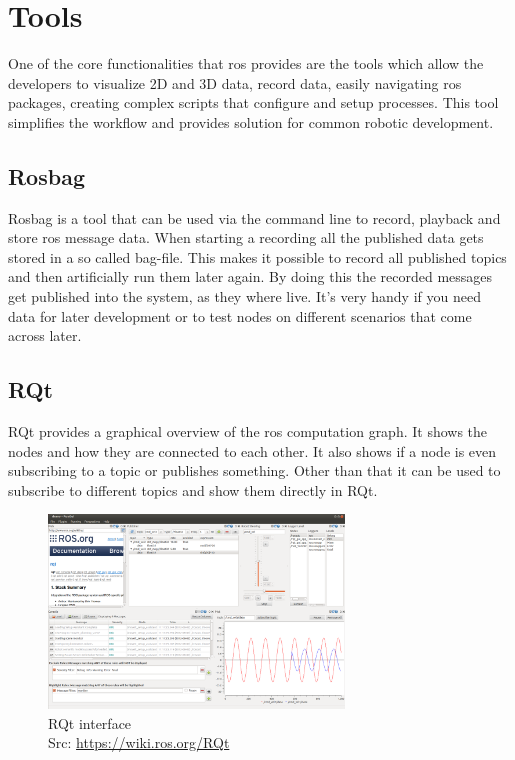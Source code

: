\section{Tools}
One of the core functionalities that \gls{ros} provides are the tools which allow the developers to visualize 2D and 3D data, record data, easily navigating \gls{ros} packages, creating complex scripts that configure and setup processes. This tool simplifies the workflow and provides solution for common robotic development.

\subsection{Rosbag}
Rosbag is a tool that can be used via the command line to record, playback and store \gls{ros} message data. When starting a recording all the published data gets stored in a so called bag-file. This makes it possible to record all published topics and then artificially run them later again. By doing this the recorded messages get published into the system, as they where live. It's very handy if you need data for later development or to test nodes on different scenarios that come across later.

\subsection{RQt}\label{rqt}
RQt provides a graphical overview of the \gls{ros} computation graph. It shows the nodes and how they are connected to each other. It also shows if a node is even subscribing to a topic or publishes something. Other than that it can be used to subscribe to different topics and show them directly in RQt.\newline
\begin{figure}[h]
	\centering
	\includegraphics[width=0.7\textwidth]{./media/images/RQt}
  	\caption{RQt interface\\Src: \url{https://wiki.ros.org/RQt}}
  	\label{rqtinterface}
\end{figure}

